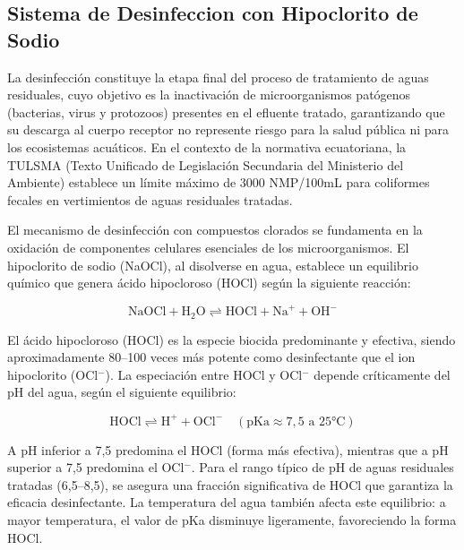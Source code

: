 \documentclass[12pt,a4paper]{article}
\begin{document}
\subsection{Sistema de Desinfeccion con Hipoclorito de Sodio}





La desinfección constituye la etapa final del proceso de tratamiento de aguas residuales, cuyo objetivo es la inactivación de microorganismos patógenos (bacterias, virus y protozoos) presentes en el efluente tratado, garantizando que su descarga al cuerpo receptor no represente riesgo para la salud pública ni para los ecosistemas acuáticos. En el contexto de la normativa ecuatoriana, la TULSMA (Texto Unificado de Legislación Secundaria del Ministerio del Ambiente) establece un límite máximo de 3000 NMP/100mL para coliformes fecales en vertimientos de aguas residuales tratadas.

El mecanismo de desinfección con compuestos clorados se fundamenta en la oxidación de componentes celulares esenciales de los microorganismos. El hipoclorito de sodio (NaOCl), al disolverse en agua, establece un equilibrio químico que genera ácido hipocloroso (HOCl) según la siguiente reacción:

\begin{equation}
\text{NaOCl} + \text{H}_2\text{O} \rightleftharpoons \text{HOCl} + \text{Na}^+ + \text{OH}^-
\end{equation}

El ácido hipocloroso (HOCl) es la especie biocida predominante y efectiva, siendo aproximadamente 80--100 veces más potente como desinfectante que el ion hipoclorito (OCl$^-$). La especiación entre HOCl y OCl$^-$ depende críticamente del pH del agua, según el siguiente equilibrio:

\begin{equation}
\text{HOCl} \rightleftharpoons \text{H}^+ + \text{OCl}^- \quad (\text{pKa} \approx 7,5 \text{ a 25°C})
\end{equation}

A pH inferior a 7,5 predomina el HOCl (forma más efectiva), mientras que a pH superior a 7,5 predomina el OCl$^-$. Para el rango típico de pH de aguas residuales tratadas (6,5--8,5), se asegura una fracción significativa de HOCl que garantiza la eficacia desinfectante. La temperatura del agua también afecta este equilibrio: a mayor temperatura, el valor de pKa disminuye ligeramente, favoreciendo la forma HOCl.
\end{document}

